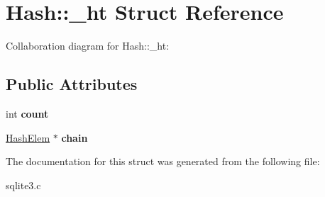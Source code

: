 \hypertarget{structHash_1_1__ht}{}\section{Hash\+:\+:\+\_\+ht Struct Reference}
\label{structHash_1_1__ht}


Collaboration diagram for Hash\+:\+:\+\_\+ht\+:
\subsection*{Public Attributes}
\begin{DoxyCompactItemize}
\item 
int {\bfseries count}\hypertarget{structHash_1_1__ht_a0677191178b6c7c5c6c2880f41cf24b1}{}\label{structHash_1_1__ht_a0677191178b6c7c5c6c2880f41cf24b1}

\item 
\hyperlink{structHashElem}{Hash\+Elem} $\ast$ {\bfseries chain}\hypertarget{structHash_1_1__ht_a56fc145e7d38d9440d85ab2ea63a48ac}{}\label{structHash_1_1__ht_a56fc145e7d38d9440d85ab2ea63a48ac}

\end{DoxyCompactItemize}


The documentation for this struct was generated from the following file\+:\begin{DoxyCompactItemize}
\item 
sqlite3.\+c\end{DoxyCompactItemize}
